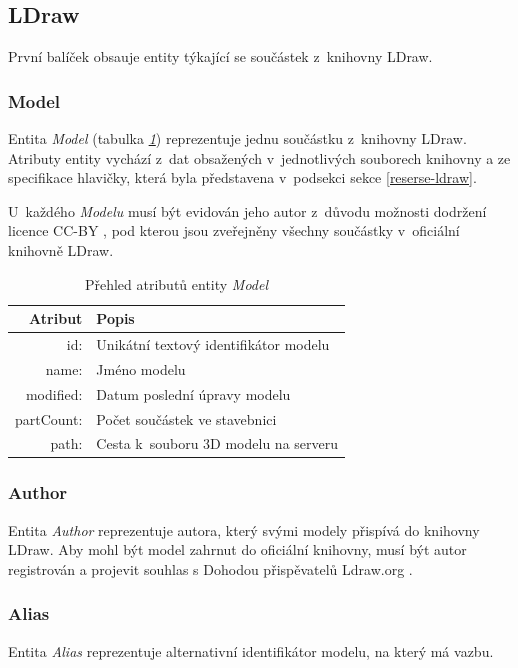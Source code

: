 \subsection{LDraw}
První balíček obsauje entity týkající se součástek z~knihovny LDraw.

\subsubsection*{Model}
  Entita \textit{Model} (tabulka \emph{\ref{table:entity:model}}) reprezentuje jednu součástku z~knihovny LDraw. Atributy entity vychází z~dat obsažených v~jednotlivých souborech knihovny a ze specifikace hlavičky, která byla představena v~podsekci \emph{} sekce \ref{reserse-ldraw}.
    
  U~každého \textit{Modelu} musí být evidován jeho autor z~důvodu možnosti dodržení licence \gls{CC-BY} \cite{CC-BY}, pod kterou jsou zveřejněny všechny součástky v~oficiální knihovně LDraw. 
  
  \begin{table}[th!]
  \centering
  \caption{Přehled atributů entity \textit{Model}}
  \label{table:entity:model}
  \begin{tabularx}{\textwidth}{@{}rX@{}}
  \toprule
  Atribut & Popis
  \\ 
  \midrule
  id: & Unikátní textový identifikátor modelu
  \\
  name: & Jméno modelu 
  \\
  modified: & Datum poslední úpravy modelu 
  \\
  partCount: & Počet součástek ve stavebnici
  \\
  path: & Cesta k~souboru 3D modelu na serveru
  \\
  \bottomrule
  \end{tabularx}
  \end{table}

\subsubsection*{Author}
Entita \textit{Author} reprezentuje autora, který svými modely přispívá do knihovny LDraw. Aby mohl být model zahrnut do oficiální knihovny, musí být autor registrován a projevit souhlas s Dohodou přispěvatelů Ldraw.org \autocite{ldraw:agreement}.
  
\subsubsection*{Alias}
Entita \textit{Alias} reprezentuje alternativní identifikátor modelu, na který má vazbu. 

